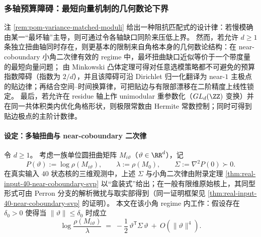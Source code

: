 \subsubsection{多轴预算障碍：最短向量机制的几何数论下界}\label{subsubsec:pom-multi-axis-budget-barrier}
注 \ref{rem:pom-variance-matched-moduli} 给出一种阻抗匹配式的设计律：若慢模确由某一“最坏轴”主导，则可通过令各轴缺口同阶来压低上界。
然而，若允许 \(d\ge 1\) 条独立扭曲轴同时存在，则更基本的限制来自角格本身的几何数论结构：在 near-coboundary 小角二次律有效的 regime 中，最坏扭曲缺口近似等价于一个带度量的最短向量问题；
由 Minkowski 凸体定理可得对任意选模策略都不可避免的预算指数障碍（指数为 \(2/d\)），并且该障碍可沿 Dirichlet 归一化翻译为 near-\(1\) 主极点的贴边律；再结合空间--时间换算律，可把贴边与有限部漂移在二阶精度上线性锁定。
最后，若允许在 residue 轴上作 unimodular 重参数化（\(GL_d(\ZZ)\) 变换）并在同一共体积类内优化角格形状，则极限常数由 Hermite 常数控制；同时可得到贴边极点的主阶计数律。

\paragraph{设定：多轴扭曲与 near-coboundary 二次律}
令 \(d\ge 1\)。
考虑一族单位圆扭曲矩阵 \(M_{i\vartheta}\)（\(\vartheta\in\RR^d\)），记
\[
P(\vartheta):=\log\rho(M_{i\vartheta}),\qquad \lambda:=\rho(M_{0}),\qquad \Sigma:=\nabla^2P(0)\succ 0.
\]
在真实输入 \(40\) 状态核的三维观测中，上述 \(\Sigma\) 与小角二次律由附录定理 \ref{thm:real-input-40-near-coboundary-svp} 以“盒装式”给出；在一般有限维原始核上，其同型形式可由 Perron 分支的解析微扰与取实部得到（同一证明框架见 \ref{thm:real-input-40-near-coboundary-svp} 的证明）。
本文在该小角 regime 内工作：假设存在 \(\delta_0>0\) 使得当 \(\|\vartheta\|\le \delta_0\) 时成立
\begin{equation}\label{eq:pom-multi-axis-near-coboundary}
\log\frac{\rho(M_{i\vartheta})}{\lambda}
\;=\;
-\frac12\,\vartheta^{\mathsf T}\Sigma\,\vartheta\ +\ O(\|\vartheta\|^4).
\end{equation}

